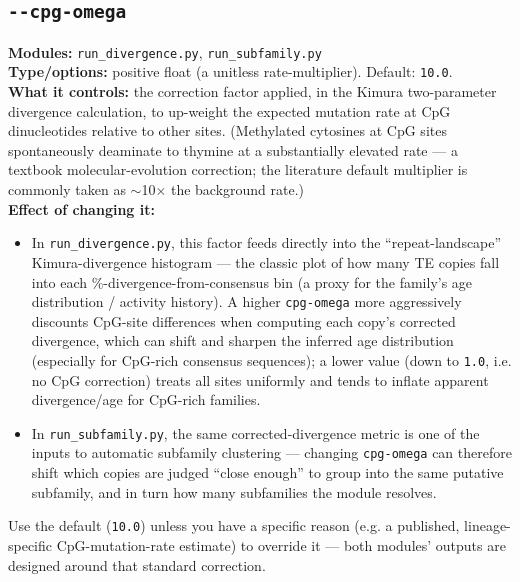 \documentclass[11pt]{article}
\newcommand{\param}[1]{\subsection*{\texttt{-\/-#1}}}
\begin{document}
\param{cpg-omega}
\textbf{Modules:} \texttt{run\_divergence.py}, \texttt{run\_subfamily.py}\\
\textbf{Type/options:} positive float (a unitless rate-multiplier). Default:
\texttt{10.0}.\\
\textbf{What it controls:} the correction factor applied, in the Kimura
two-parameter divergence calculation, to up-weight the expected mutation rate at CpG
dinucleotides relative to other sites. (Methylated cytosines at CpG sites spontaneously
deaminate to thymine at a substantially elevated rate — a textbook molecular-evolution
correction; the literature default multiplier is commonly taken as $\sim$10$\times$ the
background rate.)\\
\textbf{Effect of changing it:}
\begin{itemize}[leftmargin=1.4em,topsep=2pt,itemsep=2pt]
  \item In \texttt{run\_divergence.py}, this factor feeds directly into the
    ``repeat-landscape'' Kimura-divergence histogram — the classic plot of how many TE
    copies fall into each \%-divergence-from-consensus bin (a proxy for the family's
    age distribution / activity history). A higher \texttt{cpg-omega} more aggressively
    discounts CpG-site differences when computing each copy's corrected divergence,
    which can shift and sharpen the inferred age distribution (especially for
    CpG-rich consensus sequences); a lower value (down to \texttt{1.0}, i.e. no CpG
    correction) treats all sites uniformly and tends to inflate apparent divergence/age
    for CpG-rich families.
  \item In \texttt{run\_subfamily.py}, the same corrected-divergence metric is one of
    the inputs to automatic subfamily clustering — changing \texttt{cpg-omega} can
    therefore shift which copies are judged ``close enough'' to group into the same
    putative subfamily, and in turn how many subfamilies the module resolves.
\end{itemize}
Use the default (\texttt{10.0}) unless you have a specific reason (e.g. a published,
lineage-specific CpG-mutation-rate estimate) to override it — both modules' outputs are
designed around that standard correction.
\end{document}
